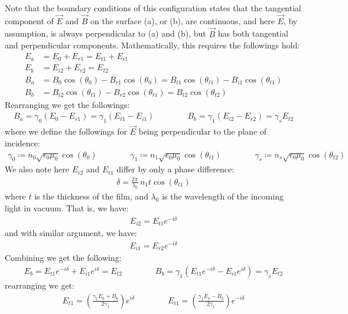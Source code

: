 \documentclass[11pt]{book}
\theoremstyle{break}
\theoremstyle{break}
\begin{document}
Note that the boundary conditions of this configuration states that the tangential component of $\vec{E}$ and $\vec{B}$ on the surface (a), or (b), are continuous, and here $\vec{E}$, by assumption, is always perpendicular to (a) and (b), but $\vec{B}$ has both tangential and perpendicular components. Mathematically, this requires the followings hold:
\begin{align}
E_a &= E_0 + E_{r1} = E_{t1} + E_{i1} \\
E_b &= E_{i2} + E_{r2} = E_{t2}\\
B_a &= B_0 \cos(\theta_0) -B_{r1}\cos(\theta_0) = B_{t1}\cos(\theta_{t1}) - B_{i1}\cos(\theta_{t1})\\
B_b &= B_{i2}\cos(\theta_{t1}) - B_{r2}\cos(\theta_{t1}) = B_{t2}\cos(\theta_{t2})
\end{align}
Rearranging we get the followings:
\begin{align*}
B_a = \gamma_0 (E_0 - E_{r1}) = \gamma_1 (E_{t1} - E_{i1}) \qquad\qquad B_b = \gamma_1 (E_{i2} - E_{r2}) = \gamma_s E_{t2}
\end{align*}
where we define the followings for $\vec{E}$ being perpendicular to the plane of incidence:
\begin{align*}
\gamma_0 \coloneqq n_0 \sqrt{\epsilon_0 \mu_0}\cos(\theta_0) \qquad\qquad \gamma_1 \coloneqq n_1 \sqrt{\epsilon_0 \mu_0}\cos(\theta_{t1}) \qquad\qquad \gamma_s \coloneqq n_s \sqrt{\epsilon_0\mu_0}\cos(\theta_{t2})
\end{align*}
We also note here $E_{i2}$ and $E_{t1}$ differ by only a phase difference:
\begin{align*}
\delta = \frac{2\pi}{\lambda_0}\, n_1 t\cos(\theta_{t1})
\end{align*}
where $t$ is the thickness of the film, and $\lambda_0$ is the wavelength of the incoming light in vacuum. That is, we have: 
\begin{align*}
E_{i2} = E_{t1}e^{-i\delta}
\end{align*}
and with similar argument, we have:
\begin{align*}
E_{i1} = E_{r2}e^{-i\delta} 
\end{align*}
Combining we get the following:
\begin{align*}
E_b = E_{t1}e^{-i\delta}+E_{i1}e^{i\delta} = E_{t2} \qquad\qquad B_b = \gamma_1(E_{t1}e^{-i\delta} - E_{i1}e^{i\delta}) = \gamma_s E_{t2}
\end{align*}
rearranging we get:
\begin{align*}
E_{t1} = \left( \frac{\gamma_1 E_b + B_b}{2\gamma_1} \right) e^{i\delta} \qquad \qquad E_{i1} = \left( \frac{\gamma_1 E_b - B_b}{2\gamma_1}\right)e^{-i\delta}
\end{align*}
\end{document}
